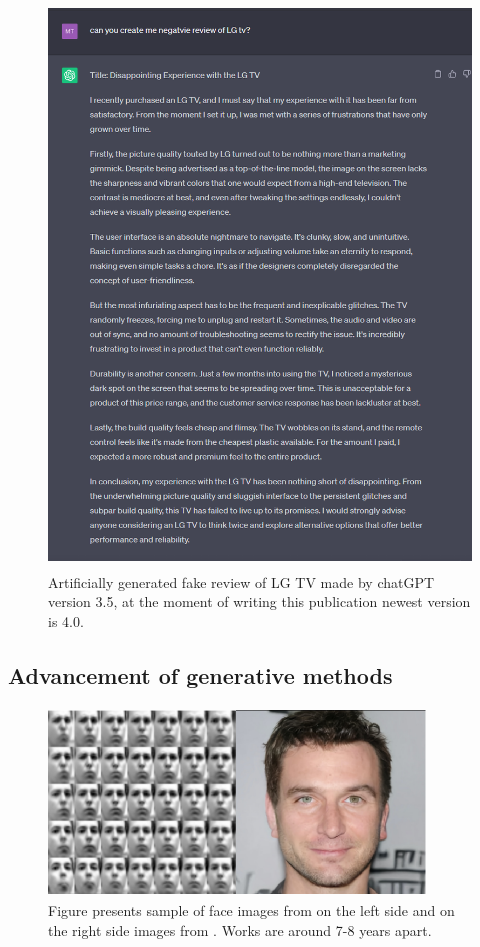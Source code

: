 \documentclass[10pt]{article}
\begin{document}
\begin{figure}
    \centering
    \includegraphics[width = 12cm, height = 15cm]{fake_review.png}
    \caption[Fake review of LG TV.]
    {Artificially generated fake review of LG TV made by chatGPT version 3.5, at the moment of writing this publication newest version is 4.0.}
    \label{fig:fake_review}
\end{figure}

\subsection{Advancement of generative methods}
\begin{figure}[H]
    \centering
    \includegraphics[width = 10cm, height = 5cm]{rozwinięte.png}
    \caption[Quality improvement of generated images.]
    {Figure presents sample of face images from \cite{var_bayes} on the left side and on the right side images from \cite{score_sde}. Works are around 7-8 years apart.}
    \label{fig:progress}
\end{figure}
\end{document}

